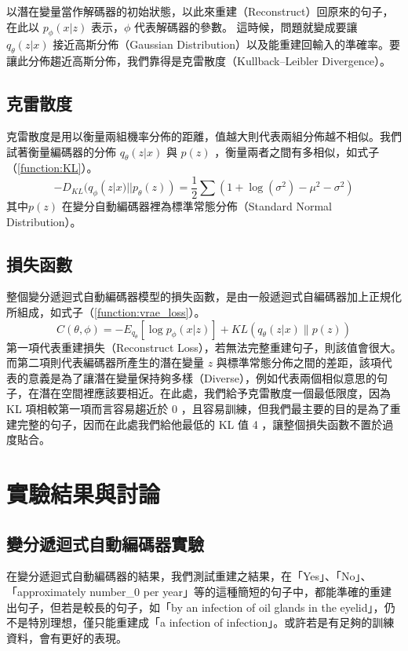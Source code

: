 以潛在變量當作解碼器的初始狀態，以此來重建（Reconstruct）回原來的句子，在此以 $p_\phi(x|z)$ 表示，$\phi$ 代表解碼器的參數。
這時候，問題就變成要讓 $q_\theta(z|x)$ 接近高斯分佈（Gaussian Distribution）以及能重建回輸入的準確率。要讓此分佈趨近高斯分佈，我們靠得是克雷散度（Kullback–Leibler Divergence）。
\subsection{克雷散度}
克雷散度是用以衡量兩組機率分佈的距離，值越大則代表兩組分佈越不相似。我們試著衡量編碼器的分佈 $q_\theta(z|x)$ 與 $p(z)$ ，衡量兩者之間有多相似，如式子（\ref{function:KL}）。
\begin{equation}
    -D_{KL}(q_\phi(z|x)|| p_\theta(z) ) = \frac{1}{2} \sum(1+\log(\sigma^2) - \mu^2 - \sigma^2)
    \label{function:KL}
\end{equation}
其中$p(z)$ 在變分自動編碼器裡為標準常態分佈（Standard Normal Distribution）。
\subsection{損失函數}
整個變分遞迴式自動編碼器模型的損失函數，是由一般遞迴式自編碼器加上正規化所組成，如式子（\ref{function:vrae_loss}）。
\begin{equation}
    C(\theta, \phi) = -E_{q_{\theta}}[\log p_\phi(x|z)] + KL(q_\theta(z|x) \| p(z))
    \label{function:vrae_loss}
\end{equation}
第一項代表重建損失（Reconstruct Loss），若無法完整重建句子，則該值會很大。
而第二項則代表編碼器所產生的潛在變量 $z$ 與標準常態分佈之間的差距，該項代表的意義是為了讓潛在變量保持夠多樣（Diverse），例如代表兩個相似意思的句子，在潛在空間裡應該要相近。在此處，我們給予克雷散度一個最低限度，因為 KL 項相較第一項而言容易趨近於 0 ，且容易訓練，但我們最主要的目的是為了重建完整的句子，因而在此處我們給他最低的 KL 值 4 ，讓整個損失函數不置於過度貼合。

\section{實驗結果與討論}
\subsection{變分遞迴式自動編碼器實驗}
在變分遞迴式自動編碼器的結果，我們測試重建之結果，在「Yes」、「No」、「approximately number\_0 per year」等的這種簡短的句子中，都能準確的重建出句子，但若是較長的句子，如「by an infection of oil glands in the eyelid」，仍不是特別理想，僅只能重建成「a infection of infection」。或許若是有足夠的訓練資料，會有更好的表現。
